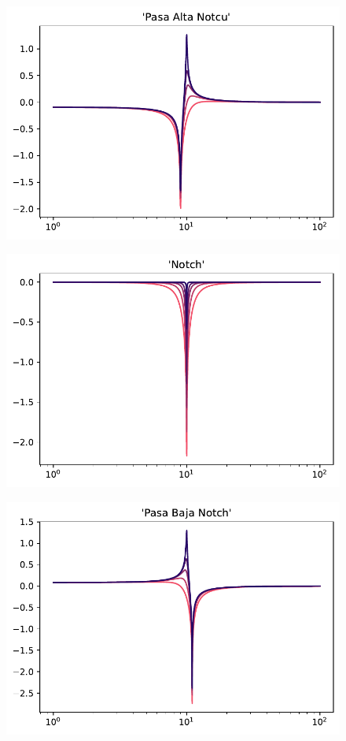 \documentclass[12pt,a4paper]{article}
\numberwithin{equation}{section}
\numberwithin{figure}{section}
\begin{document}
\begin{figure}[h!] \centering
\includegraphics[scale=1.2]{Bode_4.pdf}
\end{figure}

\begin{figure}[h!] \centering
\includegraphics[scale=1.2]{Bode_5.pdf}
\end{figure}

\begin{figure}[h!] \centering
\includegraphics[scale=1.2]{Bode_6.pdf}
\end{figure}
\end{document}
